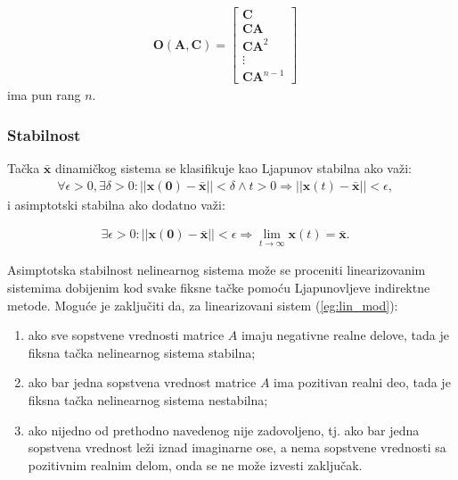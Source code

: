 \documentclass[a4paper,11pt]{article}
\theoremstyle{definition} \newtheorem{deff}{Definicija}[section]
\theoremstyle{definition} \newtheorem{prim}[deff]{Primer}
\theoremstyle{plain} \newtheorem{teor}[deff]{Teorema}
\newcommand{\vect}[1]{\boldsymbol{\mathbf{#1}}}
\begin{document}
	\begin{align}
		\vect{O}(\vect{A}, \vect{C}) = \begin{bmatrix}
			\vect{C} \\
			\vect{C}\vect{A} \\
			\vect{C}\vect{A}^2 \\
			\vdots \\
			\vect{C}\vect{A}^{n-1}
		\end{bmatrix} \quad
	\end{align}
	ima pun rang $n$. \\[16pt]
	
	\subsubsection{Stabilnost}
	
	
	
	Tačka \(\vect{\bar{x}}\) dinamičkog sistema se klasifikuje kao Ljapunov stabilna ako važi:
	\begin{align}
		\forall \epsilon > 0, \exists \delta > 0 : ||\vect{x(0)} - \vect{\bar{x}}|| < \delta \land t > 0 \Rightarrow ||\vect{x}(t) - \vect{\bar{x}}|| < \epsilon, \quad 
	\end{align}
	i asimptotski stabilna ako dodatno važi:
	
	\begin{align}
		\exists \epsilon > 0 : ||\vect{x(0)} - \vect{\bar{x}}|| < \epsilon \Rightarrow \lim_{t \to \infty} \vect{x}(t) = \vect{\bar{x}}. \quad
	\end{align}
	
	Asimptotska stabilnost nelinearnog sistema može se proceniti linearizovanim sistemima dobijenim kod svake fiksne tačke pomoću Ljapunovljeve indirektne metode. Moguće je zaključiti da, za linearizovani sistem (\ref{eg:lin_mod}):
	\begin{enumerate}
		\item ako sve sopstvene vrednosti matrice \(A\) imaju negativne realne delove, tada je fiksna tačka nelinearnog sistema stabilna;
		\item ako bar jedna sopstvena vrednost matrice \(A\) ima pozitivan realni deo, tada je fiksna tačka nelinearnog sistema nestabilna;
		\item ako nijedno od prethodno navedenog nije zadovoljeno, tj. ako bar jedna sopstvena vrednost leži iznad imaginarne ose, a nema sopstvene vrednosti sa pozitivnim realnim delom, onda se ne može izvesti zaključak.
	\end{enumerate} 
	
\end{document}
